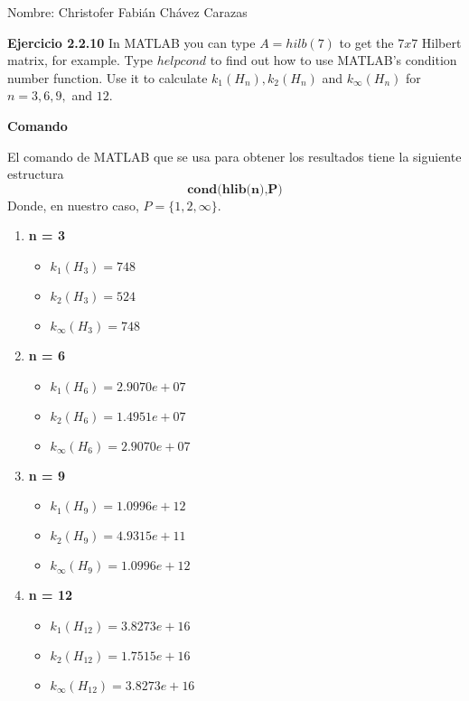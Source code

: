 \documentclass[a4paper,12pt]{article}
\begin{document}
  \begin{LARGE}
   Nombre: Christofer Fabián Chávez Carazas
  \end{LARGE}
  \par
  \textbf{Ejercicio 2.2.10} In MATLAB you can type $A = hilb (7)$ to get the $7 x 7$ Hilbert matrix, for
example. Type $help cond$ to find out how to use MATLAB's condition number
function. Use it to calculate $k_{1} (H_{n}), k_{2} (H_{n}) $ and $k_{\infty} (H_{n})$ for $n = 3,6, 9, $ and $ 12$.

\vspace{5mm}

\begin{large}
  \textbf{Comando}
\end{large}

\par

El comando de MATLAB que se usa para obtener los resultados tiene la siguiente estructura
$$ \textbf{cond(hlib(n),P)} $$
Donde, en nuestro caso, $P = \{1,2,\infty\}$.

\begin{enumerate}

\item \textbf{n = 3}
\begin{itemize}
\item $k_{1}(H_{3}) = 748$ 
\item $k_{2}(H_{3}) = 524$
\item $k_{\infty}(H_{3}) = 748$
\end{itemize}

\item \textbf{n = 6}
\begin{itemize}
\item $k_{1}(H_{6}) = 2.9070e+07$ 
\item $k_{2}(H_{6}) = 1.4951e+07$
\item $k_{\infty}(H_{6}) = 2.9070e+07$
\end{itemize}

\item \textbf{n = 9}
\begin{itemize}
\item $k_{1}(H_{9}) = 1.0996e+12$ 
\item $k_{2}(H_{9}) = 4.9315e+11$
\item $k_{\infty}(H_{9}) = 1.0996e+12$
\end{itemize}

\item \textbf{n = 12}
\begin{itemize}
\item $k_{1}(H_{12}) = 3.8273e+16$ 
\item $k_{2}(H_{12}) = 1.7515e+16$
\item $k_{\infty}(H_{12}) = 3.8273e+16$
\end{itemize}

\end{enumerate}
\end{document}
